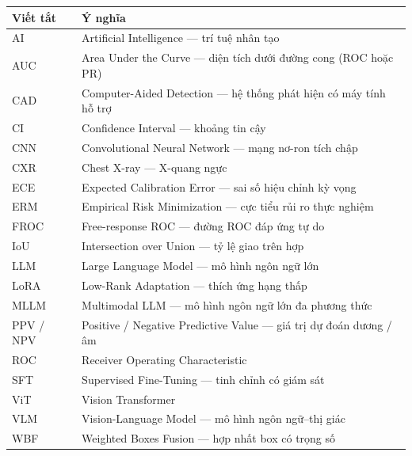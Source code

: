 \begin{center}
\renewcommand{\arraystretch}{1.15}
\begin{tabularx}{\textwidth}{@{}l L@{}}
\toprule
\textbf{Viết tắt} & \textbf{Ý nghĩa} \\
\midrule
AI        & Artificial Intelligence --- trí tuệ nhân tạo \\
AUC       & Area Under the Curve --- diện tích dưới đường cong (ROC hoặc PR) \\
CAD       & Computer-Aided Detection --- hệ thống phát hiện có máy tính hỗ trợ \\
CI        & Confidence Interval --- khoảng tin cậy \\
CNN       & Convolutional Neural Network --- mạng nơ-ron tích chập \\
CXR       & Chest X-ray --- X-quang ngực \\
ECE       & Expected Calibration Error --- sai số hiệu chỉnh kỳ vọng \\
ERM       & Empirical Risk Minimization --- cực tiểu rủi ro thực nghiệm \\
FROC      & Free-response ROC --- đường ROC đáp ứng tự do \\
IoU       & Intersection over Union --- tỷ lệ giao trên hợp \\
LLM       & Large Language Model --- mô hình ngôn ngữ lớn \\
LoRA      & Low-Rank Adaptation --- thích ứng hạng thấp \\
MLLM      & Multimodal LLM --- mô hình ngôn ngữ lớn đa phương thức \\
PPV / NPV & Positive / Negative Predictive Value --- giá trị dự đoán dương / âm \\
ROC       & Receiver Operating Characteristic \\
SFT       & Supervised Fine-Tuning --- tinh chỉnh có giám sát \\
ViT       & Vision Transformer \\
VLM       & Vision-Language Model --- mô hình ngôn ngữ--thị giác \\
WBF       & Weighted Boxes Fusion --- hợp nhất box có trọng số \\
\bottomrule
\end{tabularx}
\end{center}
